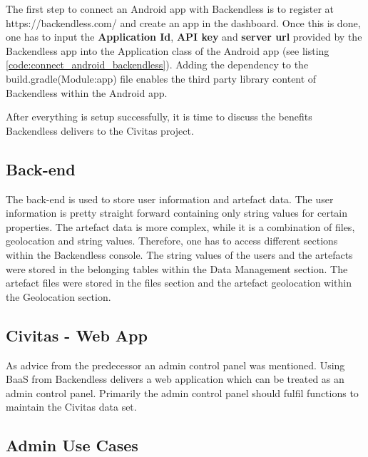 The first step to connect an Android app with Backendless is to register at https://backendless.com/ and create an app in the dashboard. Once this is done, one has to input the \textbf{Application Id}, \textbf{API key} and \textbf{server url} provided by the Backendless app into the Application class of the Android app (see listing \ref{code:connect_android_backendless}). Adding the dependency to the build.gradle(Module:app) file enables the third party library content of Backendless within the Android app.

\begin{mdframed}

\end{mdframed}

After everything is setup successfully, it is time to discuss the benefits Backendless delivers to the Civitas project.

\subsection{Back-end}
The back-end is used to store user information and artefact data. The user information is pretty straight forward containing only string values for certain properties. The artefact data is more complex, while it is a combination of files, geolocation and string values. Therefore, one has to access different sections within the Backendless console. The string values of the users and the artefacts were stored in the belonging tables within the Data Management section. The artefact files were stored in the files section and the artefact geolocation within the Geolocation section.



\subsection{Civitas - Web App}
As advice from the predecessor an admin control panel was mentioned. Using BaaS from Backendless delivers a web application which can be treated as an admin control panel. Primarily the admin control panel should fulfil functions to maintain the Civitas data set. 

\subsection{Admin Use Cases}

